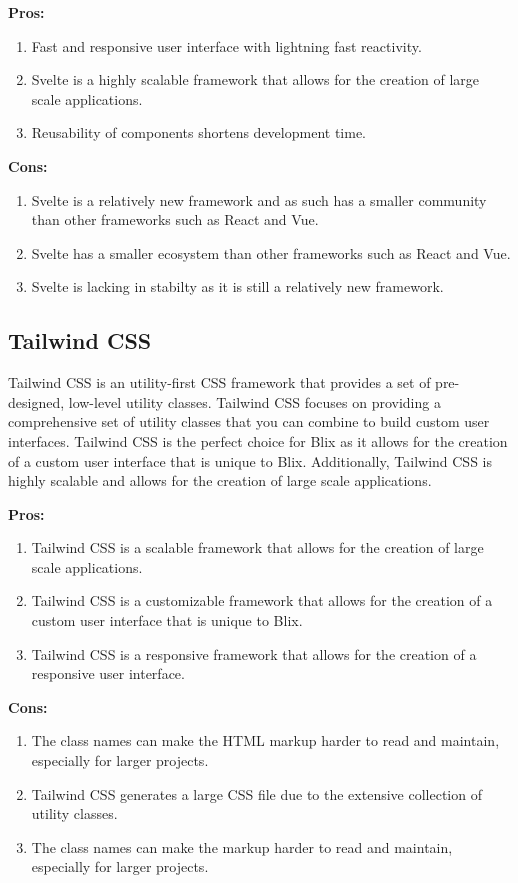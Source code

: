 \documentclass[11pt,a4paper]{article}
\begin{document}
\textbf{Pros:}
\begin{enumerate}[label*=\arabic*.]
	\item[\textbullet] Fast and responsive user interface with lightning fast reactivity. 
	\item[\textbullet] Svelte is a highly scalable framework that allows for the creation of large scale applications.
	\item[\textbullet] Reusability of components shortens development time.
\end{enumerate}


\textbf{Cons:}
\begin{enumerate}[label*=\arabic*.]
	\item[\textbullet] Svelte is a relatively new framework and as such has a smaller community than other frameworks such as React and Vue.
	\item[\textbullet] Svelte has a smaller ecosystem than other frameworks such as React and Vue.
	\item[\textbullet] Svelte is lacking in stabilty as it is still a relatively new framework.
\end{enumerate}

\subsection{Tailwind CSS}
Tailwind CSS is an utility-first CSS framework that provides a set of pre-designed, low-level utility classes. Tailwind CSS focuses on providing a comprehensive set of utility classes that you can combine to build custom user interfaces.
Tailwind CSS is the perfect choice for Blix as it allows for the creation of a custom user interface that is unique to Blix. 
Additionally, Tailwind CSS is highly scalable and allows for the creation of large scale applications.

\textbf{Pros:}
\begin{enumerate}[label*=\arabic*.]
	\item[\textbullet] Tailwind CSS is a scalable framework that allows for the creation of large scale applications.
	\item[\textbullet] Tailwind CSS is a customizable framework that allows for the creation of a custom user interface that is unique to Blix.
	\item[\textbullet] Tailwind CSS is a responsive framework that allows for the creation of a responsive user interface.
\end{enumerate}

\textbf{Cons:}
\begin{enumerate}[label*=\arabic*.]
	\item[\textbullet] The class names can make the HTML markup harder to read and maintain, especially for larger projects.
	\item[\textbullet] Tailwind CSS generates a large CSS file due to the extensive collection of utility classes. 
	\item[\textbullet] The class names can make the markup harder to read and maintain, especially for larger projects.
\end{enumerate}
\end{document}
